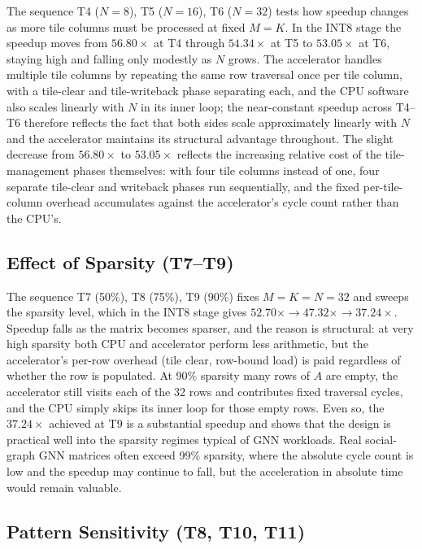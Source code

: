 The sequence T4 ($N = 8$), T5 ($N = 16$), T6 ($N = 32$) tests how
speedup changes as more tile columns must be processed at fixed $M = K$.
In the INT8 stage the speedup moves from $56.80\times$ at T4 through
$54.34\times$ at T5 to $53.05\times$ at T6, staying high and falling only
modestly as $N$ grows. The accelerator handles multiple tile columns by
repeating the same row traversal once per tile column, with a tile-clear
and tile-writeback phase separating each, and the CPU software also
scales linearly with $N$ in its inner loop; the near-constant speedup
across T4--T6 therefore reflects the fact that both sides scale
approximately linearly with $N$ and the accelerator maintains its
structural advantage throughout. The slight decrease from $56.80\times$
to $53.05\times$ reflects the increasing relative cost of the
tile-management phases themselves: with four tile columns instead of
one, four separate tile-clear and writeback phases run sequentially, and
the fixed per-tile-column overhead accumulates against the accelerator's
cycle count rather than the CPU's.

\subsection{Effect of Sparsity (T7--T9)}

The sequence T7 (50\%), T8 (75\%), T9 (90\%) fixes $M = K = N = 32$ and
sweeps the sparsity level, which in the INT8 stage gives
$52.70\times \to 47.32\times \to 37.24\times$. Speedup falls as the
matrix becomes sparser, and the reason is structural: at very high
sparsity both CPU and accelerator perform less arithmetic, but the
accelerator's per-row overhead (tile clear, row-bound load) is paid
regardless of whether the row is populated. At 90\% sparsity many rows
of $A$ are empty, the accelerator still visits each of the 32 rows and
contributes fixed traversal cycles, and the CPU simply skips its inner
loop for those empty rows. Even so, the $37.24\times$ achieved at T9 is
a substantial speedup and shows that the design is practical well into
the sparsity regimes typical of GNN workloads. Real social-graph GNN
matrices often exceed 99\% sparsity, where the absolute cycle count is
low and the speedup may continue to fall, but the acceleration in
absolute time would remain valuable.

\subsection{Pattern Sensitivity (T8, T10, T11)}

